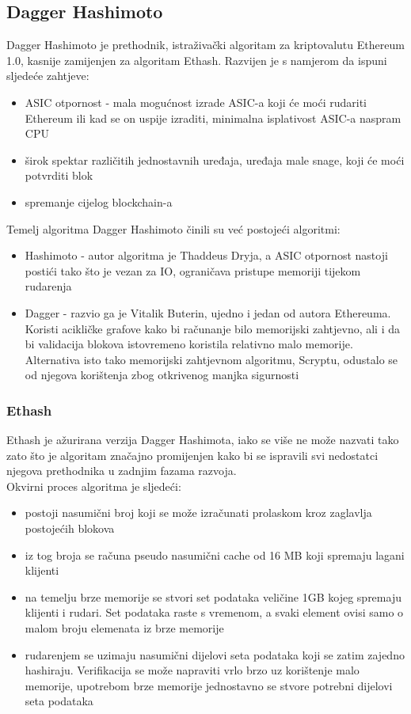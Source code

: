 \documentclass[12pt]{article}
\begin{document}
\subsection{Dagger Hashimoto}
Dagger Hashimoto je prethodnik, istraživački algoritam za kriptovalutu Ethereum 1.0, kasnije zamijenjen za algoritam Ethash. Razvijen je s namjerom da ispuni sljedeće zahtjeve:
\begin{itemize}
	\item ASIC otpornost - mala mogućnost izrade ASIC-a koji će moći rudariti Ethereum ili kad se on uspije izraditi, minimalna isplativost ASIC-a naspram CPU
	\item širok spektar različitih jednostavnih uređaja, uređaja male snage, koji će moći potvrditi blok
	\item spremanje cijelog blockchain-a
\end{itemize}
Temelj algoritma Dagger Hashimoto činili su već postojeći algoritmi:
\begin{itemize}
	\item Hashimoto - autor algoritma je Thaddeus Dryja, a ASIC otpornost nastoji postići tako što je vezan za IO, ograničava pristupe memoriji tijekom rudarenja 
	\item Dagger - razvio ga je Vitalik Buterin, ujedno i jedan od autora Ethereuma. Koristi acikličke grafove kako bi računanje bilo memorijski zahtjevno, ali i da bi validacija blokova istovremeno koristila relativno malo memorije. Alternativa isto tako memorijski zahtjevnom algoritmu, Scryptu, odustalo se od njegova korištenja zbog otkrivenog manjka sigurnosti
\end{itemize}
\cite{dagger-hashimoto}

\subsubsection{Ethash}
Ethash je ažurirana verzija Dagger Hashimota, iako se više ne može nazvati tako zato što je algoritam značajno promijenjen kako bi se ispravili svi nedostatci njegova prethodnika u zadnjim fazama razvoja.\\
Okvirni proces algoritma je sljedeći:
\begin{itemize}
	\item postoji nasumični broj koji se može izračunati prolaskom kroz zaglavlja postojećih blokova 
	\item iz tog broja se računa pseudo nasumični cache od 16 MB koji spremaju lagani klijenti
	\item na temelju brze memorije se stvori set podataka veličine 1GB kojeg spremaju klijenti i rudari. Set podataka raste s vremenom, a svaki element ovisi samo o malom broju elemenata iz brze memorije
	\item rudarenjem se uzimaju nasumični dijelovi seta podataka koji se zatim zajedno hashiraju. Verifikacija se može napraviti vrlo brzo uz korištenje malo memorije, upotrebom brze memorije jednostavno se stvore potrebni dijelovi seta podataka\cite{ethash}
\end{itemize}
%
\end{document}
